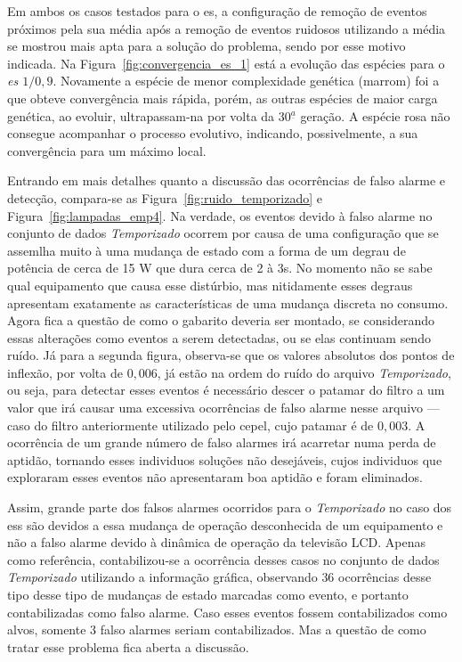 Em ambos os casos testados para o \acs{es}, a configuração de remoção
de eventos próximos pela sua média após a remoção de eventos ruidosos utilizando a
média se mostrou mais apta para a solução do problema, sendo por esse
motivo indicada. Na Figura~\ref{fig:convergencia_es_1} está a evolução
das espécies para o \emph{\acs{es} $1/0,9$}. Novamente a espécie de
menor complexidade genética (marrom) foi a que obteve convergência
mais rápida, porém, as outras espécies de maior carga genética, ao
evoluir, ultrapassam-na por volta da 30$^{\underline{a}}$ geração. A espécie rosa
não consegue acompanhar o processo evolutivo, indicando,
possivelmente, a sua convergência para um máximo local.

Entrando em mais detalhes quanto a discussão das ocorrências de falso
alarme e detecção, compara-se as Figura~\ref{fig:ruido_temporizado} e
Figura~\ref{fig:lampadas_emp4}. Na verdade, os eventos devido à falso
alarme no conjunto de dados \emph{Temporizado} ocorrem por causa de
uma configuração que se assemlha muito à uma mudança de estado com a
forma de um degrau de potência de cerca de 15 W que dura cerca de 2 à 
3s. No momento não se sabe qual equipamento que causa esse distúrbio,
mas nitidamente esses degraus apresentam exatamente as características
de uma mudança discreta no consumo. Agora fica a questão de como o
gabarito deveria ser montado, se considerando essas alterações como
eventos a serem detectadas, ou se elas continuam sendo ruído. 
Já para a segunda figura, observa-se que os valores
absolutos dos pontos de inflexão, por volta de $0,006$, já estão na
ordem do ruído do arquivo \emph{Temporizado}, ou seja, para detectar
esses eventos é necessário descer o patamar do filtro a um valor que
irá causar uma excessiva ocorrências de falso alarme nesse arquivo ---
caso do filtro anteriormente utilizado pelo \acs{cepel}, cujo patamar
é de $0,003$. A ocorrência de um grande número de falso alarmes irá
acarretar numa perda de aptidão, tornando esses individuos soluções
não desejáveis, cujos individuos que exploraram esses eventos não
apresentaram boa aptidão e foram eliminados.

Assim, grande parte dos falsos alarmes ocorridos para o
\emph{Temporizado} no caso dos \glspl{es} são devidos a essa mudança
de operação desconhecida de um equipamento e não a falso alarme devido à
dinâmica de operação da televisão LCD. Apenas como referência,
contabilizou-se a ocorrência desses casos no conjunto de dados
\emph{Temporizado} utilizando a informação gráfica, observando 36
ocorrências desse tipo desse tipo de mudanças de estado marcadas como
evento, e portanto contabilizadas como falso alarme. Caso esses
eventos fossem contabilizados como alvos, somente 3 falso alarmes
seriam contabilizados. Mas a questão de como tratar esse
problema fica aberta a discussão.

